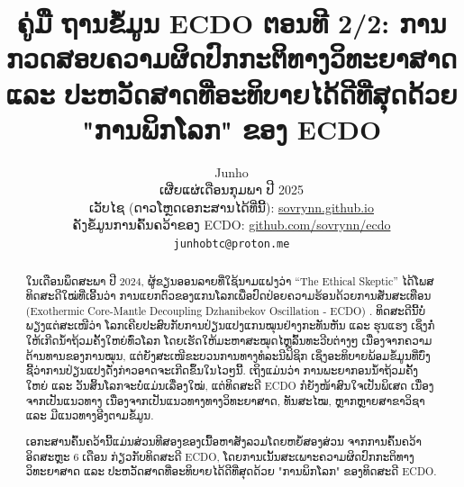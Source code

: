 \documentclass[10pt,twocolumn,letterpaper]{article}
\begin{document}
\title{ຄູ່ມື ຖານຂໍ້ມູນ ECDO ຕອນທີ 2/2: ການກວດສອບຄວາມຜິດປົກກະຕິທາງວິທະຍາສາດ ແລະ ປະຫວັດສາດທີ່ອະທິບາຍໄດ້ດີທີ່ສຸດດ້ວຍ "ການພິກໂລກ" ຂອງ ECDO}

\author{Junho\\
ເຜີ່ຍແຜ່ເດືອນກຸມພາ ປີ 2025\\
ເວັບໄຊ (ດາວໂຫຼດເອກະສານໄດ້ທີ່ນີ້): \href{https://sovrynn.github.io}{sovrynn.github.io}\\
ຄັງຂໍ້ມູນການຄົ້ນຄວ້າຂອງ ECDO: \href{https://github.com/sovrynn/ecdo}{github.com/sovrynn/ecdo}\\
{\tt\small junhobtc@proton.me}
}
\maketitle

\begin{abstract}
ໃນເດືອນພຶດສະພາ ປີ 2024, ຜູ້ຂຽນອອນລາຍທີ່ໃຊ້ນາມແຝງວ່າ “The Ethical Skeptic” \cite{0} ໄດ້ໂພສທິດສະດີໃໝ່ທີ່ເອີ້ນວ່າ ການແຍກຕົວຂອງແກນໂລກເພື່ອປົດປ່ອຍຄວາມຮ້ອນດ້ວຍການສັ່ນສະເທືອນ (Exothermic Core-Mantle Decoupling Dzhanibekov Oscillation - ECDO) \cite{1}. ທິດສະດີນີ້ບໍ່ພຽງແຕ່ສະເໜີວ່າ ໂລກເຄີຍປະສົບກັບການປ່ຽນແປງແກນໝຸນຢ່າງກະທັນຫັນ ແລະ ຮຸນແຮງ ເຊິ່ງກໍ່ໃຫ້ເກີດນ້ຳຖ້ວມຄັ້ງໃຫຍ່ທົ່ວໂລກ ໂດຍເຮັດໃຫ້ມະຫາສະໝຸດໄຫຼລົ້ນທະວີບຕ່າງໆ ເນື່ອງຈາກຄວາມຕ້ານທານຂອງການໝຸນ, ແຕ່ຍັງສະເໜີຂະບວນການທາງທໍລະນີຟິຊິກ ເຊິ່ງອະທິບາຍພ້ອມຂໍ້ມູນທີ່ບົ່ງຊີ້ວ່າການປ່ຽນແປງດັ່ງກ່າວອາດຈະເກີດຂຶ້ນໃນໄວໆນີ້. ເຖິງແມ່ນວ່າ ການພະຍາກອນນ້ຳຖ້ວມຄັ້ງໃຫຍ່ ແລະ ວັນສິ້ນໂລກຈະບໍ່ແມ່ນເລື່ອງໃໝ່, ແຕ່ທິດສະດີ ECDO ກໍຍັງໜ້າສົນໃຈເປັນພິເສດ ເນື່ອງຈາກເປັນແນວທາງ ເນື່ອງຈາກເປັນແນວທາງທາງວິທະຍາສາດ, ທັນສະໄໝ, ຫຼາກຫຼາຍສາຂາວິຊາ ແລະ ມີແນວທາງອີງຕາມຂໍ້ມູນ.

ເອກະສານຄົ້ນຄວ້ານີ້ແມ່ນສ່ວນທີສອງຂອງເນື້ອຫາສັງລວມໂດຍຫຍໍ້ສອງສ່ວນ ຈາກການຄົ້ນຄວ້າອິດສະຫຼະ 6 ເດືອນ \cite{2,20} ກ່ຽວກັບທິດສະດີ ECDO, ໂດຍການເນັ້ນສະເພາະຄວາມຜິດປົກກະຕິທາງວິທະຍາສາດ ແລະ ປະຫວັດສາດທີ່ອະທິບາຍໄດ້ດີທີ່ສຸດດ້ວຍ "ການພິກໂລກ" ຂອງທິດສະດີ ECDO.

\end{abstract}

\end{document}
